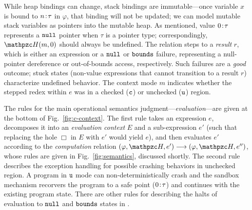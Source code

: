 While heap bindings can change, stack bindings are immutable---once
variable $x$ is bound to ${n}\!:\!{\tau}$ in $\varphi$, that binding will not
be updated; we can model mutable stack variables as pointers into the
mutable heap.
As mentioned, value ${0}\!:\!{\tau}$
represents a $\mathtt{null}$ pointer when $\tau$ is a pointer type;
correspondingly, $\heap(m,0)$ should always be undefined.
The relation steps to a \emph{result} $r$,
which is either an expression or a $\mathtt{null}$ or $\mathtt{bounds}$ failure,
representing a null-pointer dereference or out-of-bounds access,
respectively. Such failures are a \emph{good} outcome; stuck states
(non-value expressions that cannot transition to a result $r$)
characterize undefined behavior.
%
The context mode $m$ indicates whether the
stepped redex within $e$ was in a checked ($\texttt{c}$) or
unchecked ($\texttt{u}$) region.

The rules for the main operational semantics
judgment---\emph{evaluation}---are given at the bottom of
Fig.~\ref{fig:c-context}.
The first rule takes an expression $e$, decomposes
it into an \emph{evaluation context} $E$ and a sub-expression $e'$
(such that replacing the hole $\Box$ in $E$ with $e'$ would yield
$e$), and then evaluates $e'$ according to the \emph{computation}
  relation $(\varphi,\heap,e') \longrightarrow (\varphi,\heap,e'')$,
whose rules are given in Fig.~\ref{fig:semantics}, discussed
shortly. 
The second rule describes the exception handling 
for possible crashing behaviors in unchecked region.
A program in $\texttt{u}$ mode can non-deterministically crash
and the \systemname sandbox mechanism recorvers
the program to a safe point (${0}\!:\!{\tau}$)
and continues with the existing program state.
There are other rules for describing the halts of evaluation to $\mathtt{null}$ and $\mathtt{bounds}$ states in .

